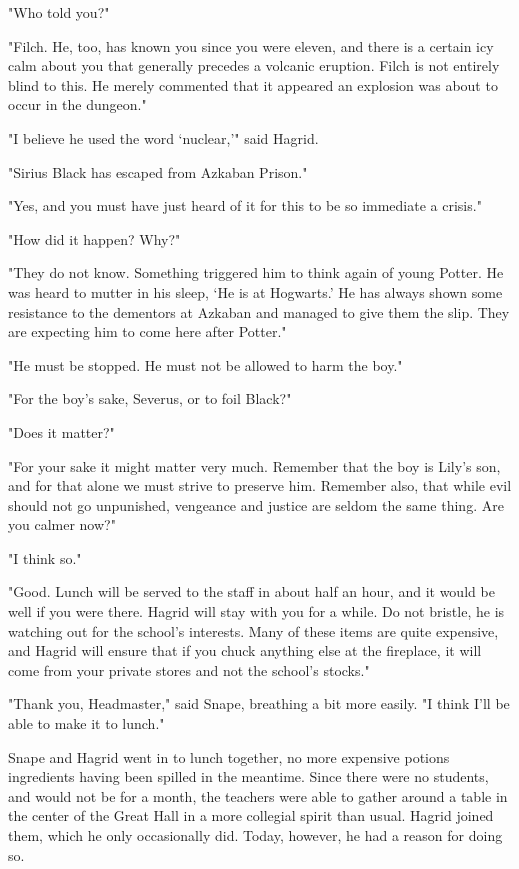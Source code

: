 "Who told you?"

"Filch. He, too, has known you since you were eleven, and there is a certain icy calm about you that generally precedes a volcanic eruption. Filch is not entirely blind to this. He merely commented that it appeared an explosion was about to occur in the dungeon."

"I believe he used the word `nuclear,'" said Hagrid.

"Sirius Black has escaped from Azkaban Prison."

"Yes, and you must have just heard of it for this to be so immediate a crisis."

"How did it happen? Why?"

"They do not know. Something triggered him to think again of young Potter. He was heard to mutter in his sleep, `He is at Hogwarts.' He has always shown some resistance to the dementors at Azkaban and managed to give them the slip. They are expecting him to come here after Potter."

"He must be stopped. He must not be allowed to harm the boy."

"For the boy's sake, Severus, or to foil Black?"

"Does it matter?"

"For your sake it might matter very much. Remember that the boy is Lily's son, and for that alone we must strive to preserve him. Remember also, that while evil should not go unpunished, vengeance and justice are seldom the same thing. Are you calmer now?"

"I think so."

"Good. Lunch will be served to the staff in about half an hour, and it would be well if you were there. Hagrid will stay with you for a while. Do not bristle, he is watching out for the school's interests. Many of these items are quite expensive, and Hagrid will ensure that if you chuck anything else at the fireplace, it will come from your private stores and not the school's stocks."

"Thank you, Headmaster," said Snape, breathing a bit more easily. "I think I'll be able to make it to lunch."

Snape and Hagrid went in to lunch together, no more expensive potions ingredients having been spilled in the meantime. Since there were no students, and would not be for a month, the teachers were able to gather around a table in the center of the Great Hall in a more collegial spirit than usual. Hagrid joined them, which he only occasionally did. Today, however, he had a reason for doing so.

